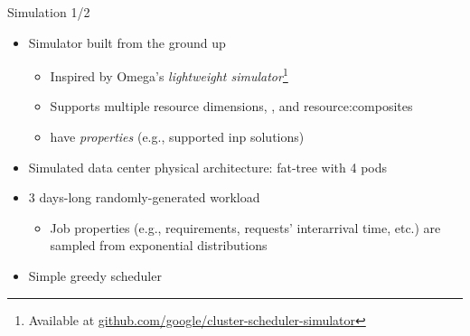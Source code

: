 \begin{frame}{Simulation 1/2}
    \begin{itemize}
        \item Simulator built from the ground up %
        \begin{itemize}
            \item Inspired by Omega's \cite{omega} \textit{lightweight simulator}\footnote[2]{\scriptsize{Available at \href{https://github.com/google/cluster-scheduler-simulator}{github.com/google/cluster-scheduler-simulator}}}
            \item Supports multiple resource dimensions, , and \glspl{resource:composite}
            \item {} have \textit{properties} (e.g., supported \gls{inp} solutions) %
        \end{itemize}
        \item Simulated data center physical architecture: fat-tree with 4 pods
        \item 3 days-long randomly-generated workload
        \begin{itemize}
            \item Job properties (e.g., requirements, requests' interarrival time, etc.) are sampled from exponential distributions %
        \end{itemize}
        \item Simple greedy scheduler
    \end{itemize}
\end{frame}

